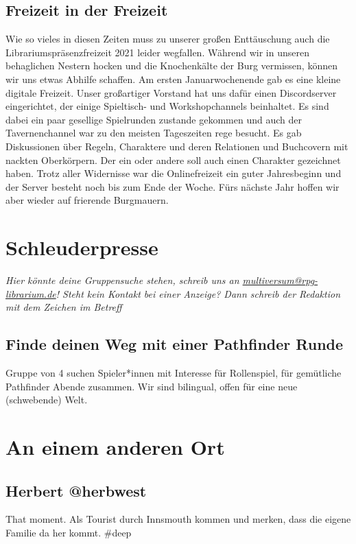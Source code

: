 \documentclass[final]{multiversum}
\begin{document}
\subsection{Freizeit in der Freizeit}
Wie so vieles in diesen Zeiten muss zu unserer großen Enttäuschung auch die Librariumspräsenzfreizeit 2021 leider wegfallen.
Während wir in unseren behaglichen Nestern hocken und die Knochenkälte der Burg vermissen, können wir uns etwas Abhilfe schaffen.
Am ersten Januarwochenende gab es eine kleine digitale Freizeit.
Unser großartiger Vorstand hat uns dafür einen Discordserver eingerichtet, der einige Spieltisch- und Workshopchannels beinhaltet.
Es sind dabei ein paar gesellige Spielrunden zustande gekommen und auch der Tavernenchannel war zu den meisten Tageszeiten rege besucht.
Es gab Diskussionen über Regeln, Charaktere und deren Relationen und Buchcovern mit nackten Oberkörpern.
Der ein oder andere soll auch einen Charakter gezeichnet haben.
Trotz aller Widernisse war die Onlinefreizeit ein guter Jahresbeginn und der Server besteht noch bis zum Ende der Woche.
Fürs nächste Jahr hoffen wir aber wieder auf frierende Burgmauern.

\section{Schleuderpresse}
\textit{Hier könnte deine Gruppensuche stehen, schreib uns an \href{mailto:multiversum@rpg-librarium.de}{multiversum@rpg-librarium.de}! 
Steht kein Kontakt bei einer Anzeige? Dann schreib der Redaktion mit dem Zeichen im Betreff}

\subsection{Finde deinen Weg mit einer Pathfinder Runde}
Gruppe von 4 suchen Spieler*innen mit Interesse für Rollenspiel, für gemütliche Pathfinder Abende zusammen.
Wir sind bilingual, offen für eine neue (schwebende) Welt.

\section{An einem anderen Ort}

\subsection{Herbert @herbwest}
That moment. Als Tourist durch Innsmouth kommen und merken, dass die eigene Familie da her kommt. \#deep
\end{document}
